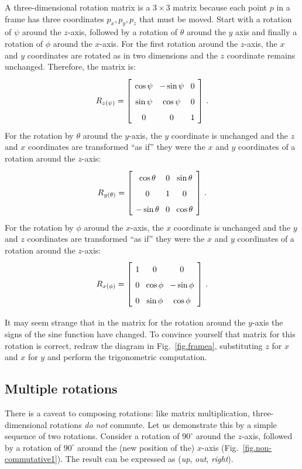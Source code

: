 A three-dimensional rotation matrix is a $3\times 3$ matrix because each point $p$ in a frame has three coordinates $p_x,p_y,p_z$ that must be moved. 
Start with a rotation of $\psi$ around the $z$-axis, followed by a rotation of $\theta$ around the $y$ axis and finally a rotation of $\phi$ around the $x$-axis. For the first rotation around the $z$-axis, the $x$ and $y$ coordinates are rotated as in two dimensions and the $z$ coordinate remains unchanged. Therefore, the matrix is:
\[
\spacearray
R_{z(\psi)}=\left[\begin{array}{ccc}\cos\psi&-\sin\psi&0\\\sin\psi&\cos\psi&0\\0&0&1\end{array}\right]\,.
\]
For the rotation by $\theta$ around the $y$-axis, the $y$ coordinate is unchanged and the $z$ and $x$ coordinates are transformed ``as if'' they were the $x$ and $y$ coordinates of a rotation around the $z$-axis:
\[
\spacearray
R_{y(\theta)}=\left[\begin{array}{ccc}\cos\theta&0&\sin\theta\\0&1&0\\-\sin\theta&0&\cos\theta\\\end{array}\right]\,.
\]
For the rotation by $\phi$ around the $x$-axis, the $x$ coordinate is unchanged and the $y$ and $z$ coordinates are transformed ``as if'' they were the $x$ and $y$ coordinates of a rotation around the $z$-axis:
\[
\spacearray
R_{x(\phi)}=\left[\begin{array}{ccc}1&0&0\\0&\cos\phi&-\sin\phi\\0&\sin\phi&\cos\phi\\\end{array}\right]\,.
\]

It may seem strange that in the matrix for the rotation around the $y$-axis  the signs of the sine function have changed. To convince yourself that matrix for this rotation is correct, redraw the diagram in Fig.~\ref{fig.framea}, substituting $z$ for $x$ and $x$ for $y$ and perform the trigonometric computation.

\subsection{Multiple rotations}

There is a caveat to composing rotations: like matrix multiplication, three\--di\-men\-sion\-al rotations \emph{do not} commute. Let us demonstrate this by a simple sequence of two rotations. Consider a rotation of $90^\circ$ around the $z$-axis, followed by a rotation of $90^\circ$ around the (new position of the) $x$-axis (Fig.~\ref{fig.non-commutative1}). The result can be expressed as (\textit{up}, \textit{out}, \textit{right}).

